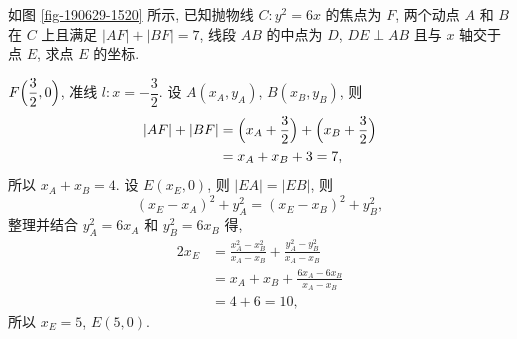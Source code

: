 \begin{exercise}
    如图 \ref{fig-190629-1520} 所示, 已知抛物线 $C\colon y^2 =6x$ 的焦点为 $F$, 两个动点 $A$ 和 $B$ 在 $C$ 上且满足 $|AF|+|BF|=7$, 线段 $AB$ 的中点为 $D$, $DE\perp AB$ 且与 $x$ 轴交于点 $E$, 求点 $E$ 的坐标.
\end{exercise}
\beginsolution
    $F\Bigl(\dfrac32,0\Bigr)$, 准线 $l\colon x=-\dfrac32$. 设 $A(x_A,y_A)$, $B(x_B,y_B)$, 则
    \[\begin{aligned}
        |AF|+|BF|
        &= \Bigl(x_A+\frac32\Bigr)+ \Bigl(x_B+\frac32\Bigr)\\
        &= x_A+x_B+3= 7,
    \end{aligned}\]
    所以 $x_A+x_B= 4$. 设 $E(x_E,0)$, 则 $|EA|= |EB|$, 则
    \[(x_E-x_A)^2+ y_A^2= (x_E-x_B)^2+ y_B^2,\]
    整理并结合 $y_A^2= 6x_A$ 和 $y_B^2= 6x_B$ 得,
    \[\begin{aligned}
        2x_E
        &= \frac{x_A^2-x_B^2}{x_A-x_B}+ \frac{y_A^2-y_B^2}{x_A-x_B}\\
        &= x_A+x_B+ \frac{6x_A-6x_B}{x_A-x_B}\\
        &= 4+6= 10,
    \end{aligned}\]
    所以 $x_E= 5$, $E(5,0)$.
\endsolution